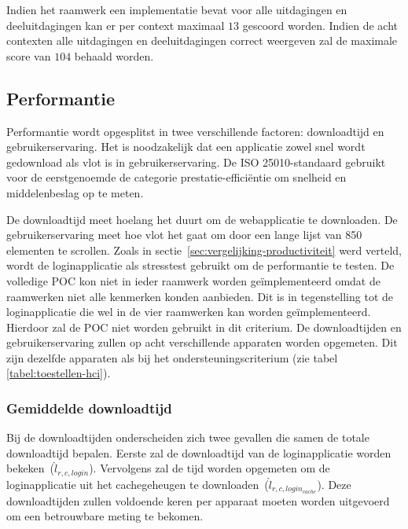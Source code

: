 Indien het raamwerk een implementatie bevat voor alle uitdagingen en deeluitdagingen kan er per context maximaal $13$ gescoord worden.
Indien de acht contexten alle uitdagingen en deeluitdagingen correct weergeven zal de maximale score van $104$ behaald worden.


\subsection{Performantie}
\label{sec:vergelijking-performantie}
Performantie wordt opgesplitst in twee verschillende factoren: downloadtijd en gebruikerservaring.
Het is noodzakelijk dat een applicatie zowel snel wordt gedownload als vlot is in gebruikerservaring.
De ISO 25010-standaard gebruikt voor de eerstgenoemde de categorie prestatie-efficiëntie om snelheid en middelenbeslag op te meten.

De downloadtijd meet hoelang het duurt om de webapplicatie te downloaden.
De gebruikerservaring meet hoe vlot het gaat om door een lange lijst van 850 elementen te scrollen.
Zoals in sectie~\ref{sec:vergelijking-productiviteit} werd verteld, wordt de loginapplicatie als stresstest gebruikt om de performantie te testen.
De volledige POC kon niet in ieder raamwerk worden geïmplementeerd omdat de raamwerken niet alle kenmerken konden aanbieden.
Dit is in tegenstelling tot de loginapplicatie die wel in de vier raamwerken kan worden geïmplementeerd.
Hierdoor zal de POC niet worden gebruikt in dit criterium.
De downloadtijden en gebruikerservaring zullen op acht verschillende apparaten worden opgemeten.
Dit zijn dezelfde apparaten als bij het ondersteuningscriterium (zie tabel \ref{tabel:toestellen-hci}).

\subsubsection{Gemiddelde downloadtijd}
Bij de downloadtijden onderscheiden zich twee gevallen die samen de totale downloadtijd bepalen.
Eerste zal de  downloadtijd van de loginapplicatie worden bekeken~($\widehat{l}_{r,c,login}$). 
Vervolgens zal de tijd worden opgemeten om de loginapplicatie uit het cachegeheugen te downloaden~($\widehat{l}_{r,c,login_{cache}}$).
Deze downloadtijden zullen voldoende keren per apparaat moeten worden uitgevoerd om een betrouwbare meting te bekomen.

